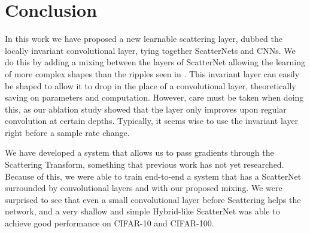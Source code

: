 \section{Conclusion}\label{sec:ch5:conclusion}
In this work we have proposed a new learnable scattering layer, dubbed the
locally invariant convolutional layer, tying together ScatterNets and CNNs.
We do this by adding a mixing between the layers of ScatterNet allowing the
learning of more complex shapes than the ripples seen in
\cite{cotter_visualizing_2017}. This invariant layer can easily be shaped to allow
it to drop in the place of a convolutional layer, theoretically saving on parameters and
computation. However, care must be taken when doing this, as our ablation study
showed that the layer only improves upon regular convolution at certain depths.
Typically, it seems wise to use the invariant layer right before a sample rate
change.

We have developed a system that allows us to pass
gradients through the Scattering Transform, something that previous work has not
yet researched. Because of this, we were able to train end-to-end a system that
has a ScatterNet surrounded by convolutional layers and with our proposed mixing. 
We were surprised to see that even a small
convolutional layer before Scattering helps the network, and a
very shallow and simple Hybrid-like ScatterNet was able to achieve good
performance on CIFAR-10 and CIFAR-100.


